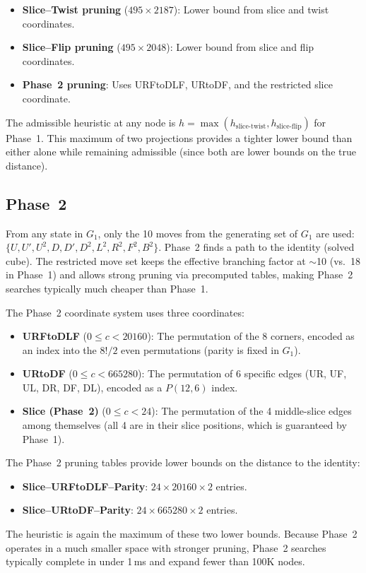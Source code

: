 \documentclass[conference]{IEEEtran}
\begin{document}
\begin{itemize}[leftmargin=*]
  \item \textbf{Slice--Twist pruning} ($495 \times 2187$): Lower bound from slice and twist coordinates.
  \item \textbf{Slice--Flip pruning} ($495 \times 2048$): Lower bound from slice and flip coordinates.
  \item \textbf{Phase~2 pruning}: Uses URFtoDLF, URtoDF, and the restricted slice coordinate.
\end{itemize}

The admissible heuristic at any node is $h = \max(h_{\text{slice-twist}}, h_{\text{slice-flip}})$ for Phase~1. This maximum of two projections provides a tighter lower bound than either alone while remaining admissible (since both are lower bounds on the true distance).

\subsection{Phase~2}
From any state in $G_1$, only the 10 moves from the generating set of $G_1$ are used: $\{U, U', U^2, D, D', D^2, L^2, R^2, F^2, B^2\}$. Phase~2 finds a path to the identity (solved cube). The restricted move set keeps the effective branching factor at $\sim$10 (vs.\ 18 in Phase~1) and allows strong pruning via precomputed tables, making Phase~2 searches typically much cheaper than Phase~1.

The Phase~2 coordinate system uses three coordinates:
\begin{itemize}[leftmargin=*]
  \item \textbf{URFtoDLF} ($0 \leq c < 20160$): The permutation of the 8 corners, encoded as an index into the $8!/2$ even permutations (parity is fixed in $G_1$).
  \item \textbf{URtoDF} ($0 \leq c < 665280$): The permutation of 6 specific edges (UR, UF, UL, DR, DF, DL), encoded as a $P(12,6)$ index.
  \item \textbf{Slice (Phase~2)} ($0 \leq c < 24$): The permutation of the 4 middle-slice edges among themselves (all 4 are in their slice positions, which is guaranteed by Phase~1).
\end{itemize}

The Phase~2 pruning tables provide lower bounds on the distance to the identity:
\begin{itemize}[leftmargin=*]
  \item \textbf{Slice--URFtoDLF--Parity}: $24 \times 20160 \times 2$ entries.
  \item \textbf{Slice--URtoDF--Parity}: $24 \times 665280 \times 2$ entries.
\end{itemize}
The heuristic is again the maximum of these two lower bounds. Because Phase~2 operates in a much smaller space with stronger pruning, Phase~2 searches typically complete in under 1\,ms and expand fewer than 100K nodes.
\end{document}
